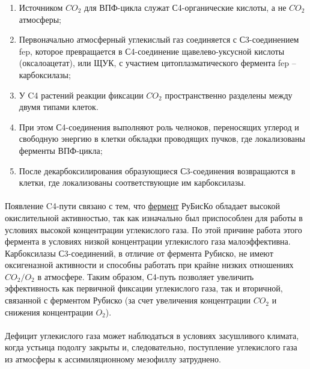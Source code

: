 \begin{enumerate}

	\item Источником $CO_{2}$ для ВПФ-цикла служат С4-органические кислоты, а не $CO_{2}$ атмосферы; 
	\item Первоначально атмосферный углекислый газ соединяется с С3-соединением \gls{fep}, которое превращается в С4-соединение щавелево-уксусной кислоты (оксалоацетат), или ЩУК, с участием цитоплазматического фермента \gls{fep} – карбоксилазы; 
	\item У C4 растений реакции фиксации $CO_{2}$ пространственно разделены между двумя типами клеток. 
	\item При этом С4-соединения выполняют роль челноков, переносящих углерод и свободную энергию в клетки обкладки проводящих пучков, где локализованы ферменты ВПФ-цикла; 
	\item После декарбоксилирования образующиеся С3-соединения возвращаются в клетки, где локализованы соответствующие им карбоксилазы. 

\end{enumerate}



\paragraph*{}Появление C4-пути связано с тем, что \hyperlink{enzimes}{фермент} РуБисКо обладает высокой окислительной активностью, так как изначально был приспособлен для работы в условиях высокой концентрации углекислого газа. По этой причине работа этого фермента в условиях низкой концентрации углекислого газа малоэффективна. Карбоксилазы С3-соединений, в отличие от фермента Рубиско, не имеют оксигеназной активности и способны работать при крайне низких отношениях $CO_{2}/O_{2}$ в атмосфере. Таким образом, С4-путь позволяет увеличить эффективность как первичной фиксации углекислого газа, так и вторичной, связанной с ферментом Рубиско (за счет увеличения концентрации $CO_{2}$ и снижения концентрации $O_{2}$).

\paragraph*{}Дефицит углекислого газа может наблюдаться в условиях засушливого климата, когда устьица подолгу закрыты и, следовательно, поступление углекислого газа из атмосферы к ассимиляционному мезофиллу затруднено.

